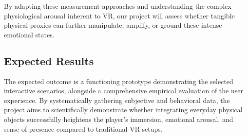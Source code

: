 By adapting these measurement approaches and understanding the complex physiological arousal inherent to VR, our project will assess whether tangible physical proxies can further manipulate, amplify, or ground these intense emotional states.

\subsection*{Expected Results}
The expected outcome is a functioning prototype demonstrating the selected interactive scenarios, alongside a comprehensive empirical evaluation of the user experience. By systematically gathering subjective and behavioral data, the project aims to scientifically demonstrate whether integrating everyday physical objects successfully heightens the player's immersion, emotional arousal, and sense of presence compared to traditional VR setups.